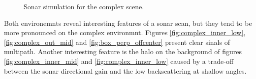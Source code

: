 \begin{figure}[ht]
    \hfill {}%
    \caption{Sonar simulation for the complex scene.}%
    \label{fig:jirau_simul}%
\end{figure}

Both environemnts reveal interesting features of a sonar scan, but they tend to
be more pronounced on the complex environmnt. Figures
\ref{fig:complex_inner_low}, \ref{fig:complex_out_mid} and
\ref{fig:box_perp_offcenter} present clear sinals of multipath. Another
interesting feature is the halo on the background of figures
\ref{fig:complex_inner_mid} and \ref{fig:complex_inner_low} caused by a
trade-off between the sonar directional gain and the low backscattering at
shallow angles.
